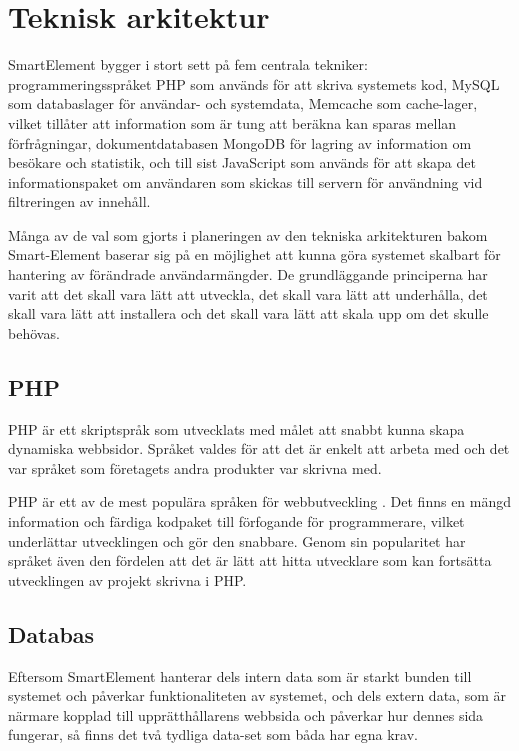 \section{Teknisk arkitektur}

SmartElement bygger i stort sett på fem centrala tekniker: programmeringsspråket PHP som används för att skriva systemets kod, MySQL som databaslager för användar- och systemdata, Memcache som cache-lager, vilket tillåter att information som är tung att beräkna kan sparas mellan förfrågningar, dokumentdatabasen MongoDB för lagring av information om besökare och statistik, och till sist JavaScript som används för att skapa det informationspaket om användaren som skickas till servern för användning vid filtreringen av innehåll.

Många av de val som gjorts i planeringen av den tekniska arkitekturen bakom Smart-Element baserar sig på en möjlighet att kunna göra systemet skalbart för hantering av förändrade användarmängder. De grundläggande principerna har varit att det skall vara lätt att utveckla, det skall vara lätt att underhålla, det skall vara lätt att installera och det skall vara lätt att skala upp om det skulle behövas.

\subsection{PHP}

PHP är ett skriptspråk som utvecklats med målet att snabbt kunna skapa dynamiska webbsidor. \citep{phpmanual} Språket valdes för att det är enkelt att arbeta med och det var språket som företagets andra produkter var skrivna med.

PHP är ett av de mest populära språken för webbutveckling \citep{tiobe}. Det finns en mängd information och färdiga kodpaket till förfogande för programmerare, vilket underlättar utvecklingen och gör den snabbare. Genom sin popularitet har språket även den fördelen att det är lätt att hitta utvecklare som kan fortsätta utvecklingen av projekt skrivna i PHP.

\subsection{Databas}

Eftersom SmartElement hanterar dels intern data som är starkt bunden till systemet och påverkar funktionaliteten av systemet, och dels extern data, som är närmare kopplad till upprätthållarens webbsida och påverkar hur dennes sida fungerar, så finns det två tydliga data-set som båda har egna krav.


